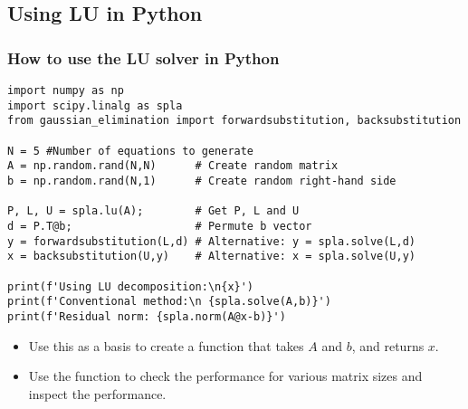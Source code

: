 
\subsection*{Using LU in Python}
\begin{frame}[fragile]
  \frametitle{How to use the LU solver in Python}
  \begin{lstlisting}
import numpy as np
import scipy.linalg as spla
from gaussian_elimination import forwardsubstitution, backsubstitution

N = 5 #Number of equations to generate
A = np.random.rand(N,N)      # Create random matrix
b = np.random.rand(N,1)      # Create random right-hand side

P, L, U = spla.lu(A);        # Get P, L and U
d = P.T@b;                   # Permute b vector 
y = forwardsubstitution(L,d) # Alternative: y = spla.solve(L,d)
x = backsubstitution(U,y)    # Alternative: x = spla.solve(U,y)

print(f'Using LU decomposition:\n{x}')
print(f'Conventional method:\n {spla.solve(A,b)}')
print(f'Residual norm: {spla.norm(A@x-b)}')
  \end{lstlisting}
  \pause
  \begin{itemize}
     \item Use this as a basis to create a function that takes $A$ and $b$, and returns $x$.
     \item Use the function to check the performance for various matrix sizes and inspect the performance.
  \end{itemize}

\end{frame}
